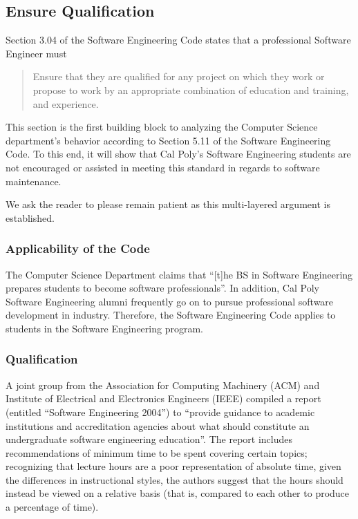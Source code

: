 \documentclass[11pt]{article}
\begin{document}
\begin{multicols}{2}
\subsection{Ensure Qualification}

Section 3.04 of the Software Engineering Code states that a professional Software Engineer must

\begin{quote}
Ensure that they are qualified for any project on which they work or propose to work by an appropriate combination of education and training, and experience. \cite{secode}
\end{quote}

This section is the first building block to analyzing the Computer Science department's behavior according to Section 5.11 of the Software Engineering Code.  To this end, it will show that Cal Poly's Software Engineering students are not encouraged or assisted in meeting this standard in regards to software maintenance.

We ask the reader to please remain patient as this multi-layered argument is established.

\subsubsection{Applicability of the Code}

The Computer Science Department claims that ``[t]he BS in Software Engineering prepares students to become software professionals''. \cite{catalogDept}  In addition, Cal Poly Software Engineering alumni frequently go on to pursue professional software development in industry. \cite{polyAlums}  Therefore, the Software Engineering Code applies to students in the Software Engineering program.

\subsubsection{Qualification}

A joint group from the Association for Computing Machinery (ACM) and Institute of Electrical and Electronics Engineers (IEEE) compiled a report (entitled ``Software Engineering 2004'') to ``provide guidance to academic institutions and accreditation agencies about what should constitute an undergraduate software engineering education''. \cite{se2004}  The report includes recommendations of minimum time to be spent covering certain topics; recognizing that lecture hours are a poor representation of absolute time, given the differences in instructional styles, the authors suggest that the hours should instead be viewed on a relative basis (that is, compared to each other to produce a percentage of time).


\end{multicols}
\end{document}
